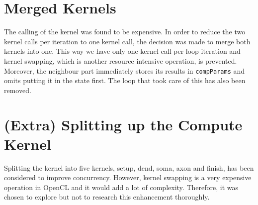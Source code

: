 \documentclass[final]{report}
\begin{document}
\section{Merged Kernels}\label{sec:one-kernel}
The calling of the kernel was found to be expensive.
In order to reduce the two kernel calls per iteration to one kernel call, the decision was made to merge both kernels into one.
This way we have only one kernel call per loop iteration and kernel swapping, which is another resource intensive operation, is prevented.
Moreover, the neighbour part immediately stores its results in \texttt{compParams} and omits putting it in the state first.
The loop that took care of this has also been removed.

\section{(Extra) Splitting up the Compute Kernel}
Splitting the kernel into five kernels, setup, dend, soma, axon and finish, has been considered to improve concurrency.
However, kernel swapping is a very expensive operation in OpenCL and it would add a lot of complexity.
Therefore, it was chosen to explore but not to research this enhancement thoroughly.








\end{document}
